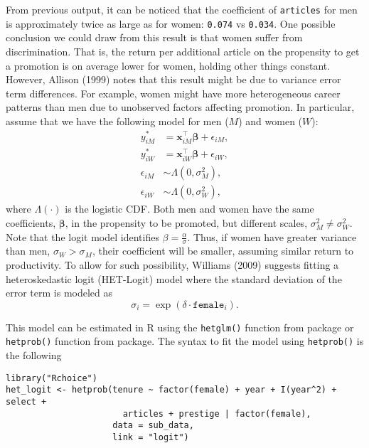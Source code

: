 From previous output, it can be noticed that the coefficient of \texttt{articles} for men is approximately twice as large as for women: \texttt{0.074} vs \texttt{0.034}. One possible conclusion we could draw from this result is that women suffer from discrimination. That is, the return per additional article on the propensity to get a promotion is on average lower for women, holding other things constant. However, Allison (1999) notes that this result might be due to variance error term differences. For example, women might have more heterogeneous career patterns than men due to unobserved factors affecting promotion. In particular, assume that we have the following model for men (\(M\)) and women (\(W\)):
\begin{align*}
  y_{iM}^* & = \mathbf x_{iM}^\top\boldsymbol \beta+ \epsilon_{iM}, \\
  y_{iW}^* & = \mathbf x_{iW}^\top\boldsymbol \beta+ \epsilon_{iW}, \\
  \epsilon_{iM} & \sim \Lambda(0, \sigma_{M}^2), \\
  \epsilon_{iW} & \sim \Lambda(0, \sigma_{W}^2),
\end{align*}
where \(\Lambda(\cdot)\) is the logistic CDF. Both men and women have the same coefficients, \(\boldsymbol \beta\), in the propensity to be promoted, but different scales, \(\sigma_{M}^2\neq \sigma_{W}^2\). Note that the logit model identifies \(\beta = \frac{\alpha}{\sigma}\). Thus, if women have greater variance than men, \(\sigma_W > \sigma_M\), their coefficient will be smaller, assuming similar return to productivity. To allow for such possibility, Williams (2009) suggests fitting a heteroskedastic logit (HET-Logit) model where the standard deviation of the error term is modeled as
\begin{equation*}
\sigma_i = \exp(\delta \cdot \texttt{female}_i).
\end{equation*}

This model can be estimated in R using the \texttt{hetglm()} function from  package or \texttt{hetprob()} function from  package. The syntax to fit the model using \texttt{hetprob()} is the following

\begin{verbatim}
library("Rchoice")
het_logit <- hetprob(tenure ~ factor(female) + year + I(year^2) + select +  
                       articles + prestige | factor(female), 
                     data = sub_data, 
                     link = "logit")
\end{verbatim}

